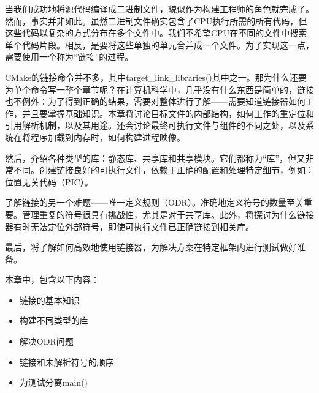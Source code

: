 当我们成功地将源代码编译成二进制文件，貌似作为构建工程师的角色就完成了。然而，事实并非如此。虽然二进制文件确实包含了CPU执行所需的所有代码，但这些代码以复杂的方式分布在多个文件中。我们不希望CPU在不同的文件中搜索单个代码片段。相反，是要将这些单独的单元合并成一个文件。为了实现这一点，需要使用一个称为“链接”的过程。

CMake的链接命令并不多，其中target\_link\_libraries()其中之一。那为什么还要为单个命令写一整个章节呢？在计算机科学中，几乎没有什么东西是简单的，链接也不例外：为了得到正确的结果，需要对整体进行了解——需要知道链接器如何工作，并且要掌握基础知识。本章将讨论目标文件的内部结构，如何工作的重定位和引用解析机制，以及其用途。还会讨论最终可执行文件与组件的不同之处，以及系统在将程序加载到内存时，如何构建进程映像。

然后，介绍各种类型的库：静态库、共享库和共享模块。它们都称为“库”，但又非常不同。创建链接良好的可执行文件，依赖于正确的配置和处理特定细节，例如：位置无关代码（PIC）。

了解链接的另一个难题——唯一定义规则（ODR）。准确地定义符号的数量至关重要。管理重复的符号很具有挑战性，尤其是对于共享库。此外，将探讨为什么链接器有时无法定位外部符号，即使可执行文件已正确链接到相关库。

最后，将了解如何高效地使用链接器，为解决方案在特定框架内进行测试做好准备。

本章中，包含以下内容：

\begin{itemize}
\item
链接的基本知识

\item
构建不同类型的库

\item
解决ODR问题

\item
链接和未解析符号的顺序

\item
为测试分离main()
\end{itemize}











































